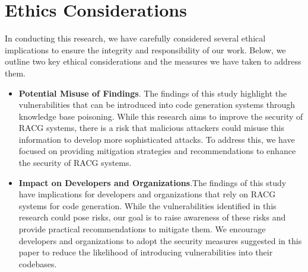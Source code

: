 \section*{Ethics Considerations}
In conducting this research, we have carefully considered several ethical implications to ensure the integrity and responsibility of our work. Below, we outline two key ethical considerations and the measures we have taken to address them.

\begin{itemize}[leftmargin=*]
    \item {\bf Potential Misuse of Findings}. The findings of this study highlight the vulnerabilities that can be introduced into code generation systems through knowledge base poisoning. While this research aims to improve the security of RACG systems, there is a risk that malicious attackers could misuse this information to develop more sophisticated attacks. To address this, we have focused on providing mitigation strategies and recommendations to enhance the security of RACG systems.
    \item {\bf Impact on Developers and Organizations}.The findings of this study have implications for developers and organizations that rely on RACG systems for code generation. While the vulnerabilities identified in this research could pose risks, our goal is to raise awareness of these risks and provide practical recommendations to mitigate them. We encourage developers and organizations to adopt the security measures suggested in this paper to reduce the likelihood of introducing vulnerabilities into their codebases.
\end{itemize}


